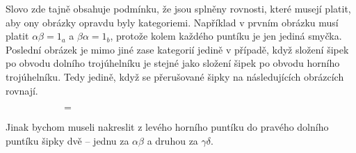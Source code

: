 \documentclass[letterpaper,11pt,leqno]{article}
\begin{document}
\begin{example}
 Slovo  zde tajně obsahuje podmínku, že jsou splněny rovnosti,
 které musejí platit, aby ony obrázky opravdu byly kategoriemi. Například v
 prvním obrázku musí platit $\alpha\beta = 1_a$ a $\beta\alpha = 1_b$, protože
 kolem každého puntíku je jen jediná smyčka. Poslední obrázek je mimo jiné zase
 kategorií jedině v případě, když složení šipek po obvodu dolního trojúhelníku
 je stejné jako složení šipek po obvodu horního trojúhelníku. Tedy jedině, když
 se přerušované šipky na následujících obrázcích rovnají.
 \begin{figure}[H]
  \centering
  \begin{subfigure}[b]{.4\textwidth}
   \raggedleft
  \end{subfigure}
  \begin{subfigure}[H]{.1\textwidth}
   \centering
   \vspace{3pt}
   {\huge $=$}
  \end{subfigure}
  \begin{subfigure}[b]{.4\textwidth}
   \raggedright
  \end{subfigure}
 \end{figure}
 Jinak bychom museli nakreslit z levého horního puntíku do pravého dolního
 puntíku šipky dvě -- jednu za $\alpha\beta$ a druhou za $\gamma\delta$.
\end{example}
\end{document}

